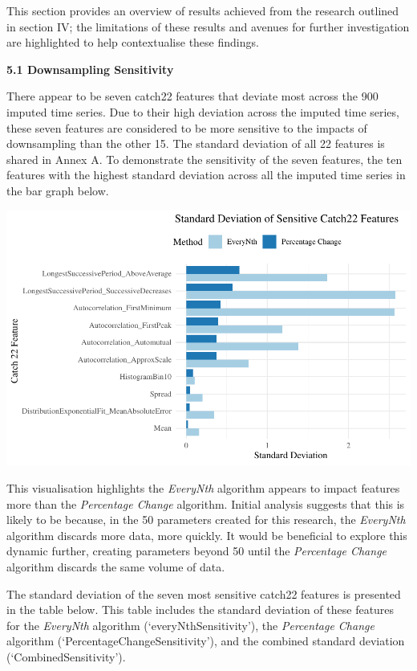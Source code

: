 \documentclass{article}
\begin{document}
This section provides an overview of results achieved from the research
outlined in section IV; the limitations of these results and avenues for
further investigation are highlighted to help contextualise these
findings.

\textbf{5.1 Downsampling Sensitivity}

There appear to be seven catch22 features that deviate most across the
900 imputed time series. Due to their high deviation across the imputed
time series, these seven features are considered to be more sensitive to
the impacts of downsampling than the other 15. The standard deviation of
all 22 features is shared in Annex A. To demonstrate the sensitivity of
the seven features, the ten features with the highest standard deviation
across all the imputed time series in the bar graph below.

\includegraphics{210431461_CSC8639_Dissertation_files/figure-latex/CombinedSensitivity-1.pdf}

This visualisation highlights the \emph{EveryNth} algorithm appears to
impact features more than the \emph{Percentage Change} algorithm.
Initial analysis suggests that this is likely to be because, in the 50
parameters created for this research, the \emph{EveryNth} algorithm
discards more data, more quickly. It would be beneficial to explore this
dynamic further, creating parameters beyond 50 until the
\emph{Percentage Change} algorithm discards the same volume of data.

The standard deviation of the seven most sensitive catch22 features is
presented in the table below. This table includes the standard deviation
of these features for the \emph{EveryNth} algorithm
(`everyNthSensitivity'), the \emph{Percentage Change} algorithm
(`PercentageChangeSensitivity'), and the combined standard deviation
(`CombinedSensitivity').
\end{document}
